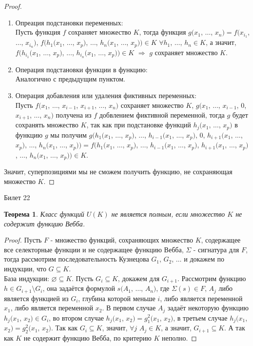 \documentclass[a4paper, 12pt]{article}
\theoremstyle{definition}
\theoremstyle{plain}
\newtheorem*{theorem}{Теорема}
\theoremstyle{remark}
\begin{document}
  \begin{proof}
    \begin{enumerate}
      \item Опреация подстановки переменных:\\
      Пусть функция $f$ сохраняет множество $K$, тогда функция $g(x_1$, $\ldots$, $x_n)=f(x_{i_1}$, $\ldots$, $x_{i_n})$, $f(h_1(x_1$, $\ldots$, $x_p)$, $\ldots$, $h_n(x_1$, $\ldots$, $x_p))\in K$ $\forall h_1$, $\ldots$, $h_n\in K$, а значит, $f(h_{i_1}(x_1$, $\ldots$, $x_p)$, $\ldots$, $h_{i_n}(x_1$, $\ldots$, $x_p))\in K$ $\Longrightarrow$ $g$ сохраняет множество $K$.
      \item Операция подстановки функции в функцию:\\
      Аналогично с предыдущим пунктом.
      \item Операция добавления или удаления фиктивных переменных:\\
      Пусть $f(x_1$, $\ldots$, $x_{i-1}$, $x_{i+1}$, $\ldots$, $x_n)$ сохраняет множество $K$,  $g(x_1$, $\ldots$, $x_{i-1}$, $0$, $x_{i+1}$, $\ldots$, $x_n)$ получена из $f$ добвлением фиктивной переменной, тогда $g$ будет сохранять множество $K$, так как при подстановке функций $h_j(x_1$, $\ldots$, $x_p)$ в функцию $g$ мы получим $g(h_1(x_1$, $\ldots$, $x_p)$, $\ldots$, $h_{i-1}(x_1$, $\ldots$, $x_p)$, $0$, $h_{i+1}(x_1$, $\ldots$, $x_p)$, $\ldots$, $h_n(x_1$, $\ldots$, $x_p))=f(h_1(x_1$, $\ldots$, $x_p)$, $\ldots$, $h_{i-1}(x_1$, $\ldots$, $x_p)$, $h_{i+1}(x_1$, $\ldots$, $x_p)$, $\ldots$, $h_n(x_1$, $\ldots$, $x_p))\in K$.
    \end{enumerate}
    Значит, суперпозициями мы не сможем получить функцию, не сохраняющая множество $K$.
  \end{proof}
  \begin{center}
    Билет 22
  \end{center}
  \begin{theorem}
    Класс функций $U(K)$ не является полным, если множество $K$ не содержит функцию Вебба.
  \end{theorem}
  \begin{proof}
    Пусть $F$ - множество функций, сохраняющих множество $K$, содержащее все селекторные функции и не содержащее функцию Вебба, $\Sigma$ - сигнатура для $F$, тогда рассмотрим последовательность Кузнецова $G_1$, $G_2$, $\ldots$ и докажем по индукции, что $G\subseteq K$.\\
    База индукции: $\varnothing\subseteq K$.
    Пусть $G_i\subseteq K$, докажем для $G_{i+1}$. Рассмотрим функцию $h\in G_{i+1}\setminus G_i$, она задаётся формулой $s(A_1$, $\ldots$, $A_n)$, где $\Sigma(s)\in F$, $A_j$ либо является функцией из $G_i$, глубина которой меньше $i$, либо является переменной $x_1$, либо является переменной $x_2$. В первом случае $A_j$ задаёт некоторую функцию $h_j(x_1$, $x_2)\in G_i$, во втором случае $h_j(x_1$, $x_2)=g_1^2(x_1$, $x_2)$, в третьем случае $h_j(x_1$, $x_2)=g_2^2(x_1$, $x_2)$. Так как $G_i\subseteq K$, значит, $\forall j$ $A_j\in K$, а значит, $G_{i+1}\subseteq K$. А так как $K$ не содержит функцию Вебба, по критерию $K$ неполно.
  \end{proof}
\end{document}
